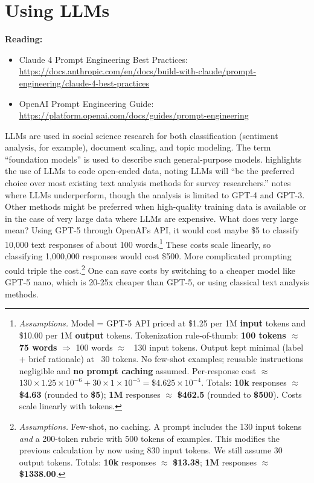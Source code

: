 \section{Using LLMs}

\begin{tcolorbox}[breakable, size=fbox, boxrule=1pt, pad at break*=1mm,colback=cellbackground, colframe=cellborder]
\textbf{Reading:}
\begin{itemize}
\item Claude 4 Prompt Engineering Best Practices: \url{https://docs.anthropic.com/en/docs/build-with-claude/prompt-engineering/claude-4-best-practices}
\item OpenAI Prompt Engineering Guide: \url{https://platform.openai.com/docs/guides/prompt-engineering}
\end{itemize}
\end{tcolorbox}

LLMs are used in social science research for both classification (sentiment analysis, for example), document scaling, and topic modeling. The term ``foundation models'' is used to describe such general-purpose models. \cite{haaland2025understanding} highlights the use of LLMs to code open-ended data, noting LLMs will ``be the preferred choice over most existing text analysis methods for survey researchers.'' \cite{ornstein2025train} notes where LLMs underperform, though the analysis is limited to GPT-4 and GPT-3. Other methods might be preferred when high-quality training data is available or in the case of very large data where LLMs are expensive. What does very large mean? Using GPT-5 through OpenAI's API, it would cost maybe \$5 to classify 10,000 text responses of about 100 words.\footnote{\textit{Assumptions.} Model = GPT-5 API priced at \$1.25 per 1M \textbf{input} tokens and \$10.00 per 1M \textbf{output} tokens. Tokenization rule-of-thumb: \textbf{100 tokens $\approx$ 75 words} $\Rightarrow$ 100 words $\approx$ ~130 input tokens. Output kept minimal (label + brief rationale) at ~30 tokens. No few-shot examples; reusable instructions negligible and \textbf{no prompt caching} assumed. Per-response cost $\approx$ \(130 \times 1.25 \times 10^{-6} + 30 \times 1 \times 10^{-5} = \$4.625 \times 10^{-4}\). Totals: \textbf{10k} responses $\approx$ \textbf{\$4.63} (rounded to \textbf{\$5}); \textbf{1M} responses $\approx$ \textbf{\$462.5} (rounded to \textbf{\$500}). Costs scale linearly with tokens.} These costs scale linearly, so classifying 1,000,000 responses would cost \$500. More complicated prompting could triple the cost.\footnote{\textit{Assumptions.} Few-shot, no caching. A prompt includes the 130 input tokens \textit{and} a 200-token rubric with 500 tokens of examples. This modifies the previous calculation by now using 830 input tokens. We still assume 30 output tokens. Totals: \textbf{10k} responses $\approx$ \textbf{\$13.38}; \textbf{1M} responses $\approx$ \textbf{\$1338.00}.} One can save costs by switching to a cheaper model like GPT-5 nano, which is 20-25x cheaper than GPT-5, or using classical text analysis methods.


